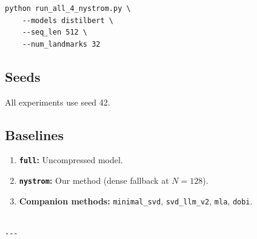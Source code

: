 \begin{lstlisting}
python run_all_4_nystrom.py \
    --models distilbert \
    --seq_len 512 \
    --num_landmarks 32
\end{lstlisting}

\subsection{Seeds}

All experiments use seed 42.

\subsection{Baselines}

\begin{enumerate}
\item \textbf{\texttt{full}:} Uncompressed model.
\item \textbf{\texttt{nystrom}:} Our method (dense fallback at $N=128$).
\item \textbf{Companion methods:} \texttt{minimal\_svd}, \texttt{svd\_llm\_v2}, \texttt{mla}, \texttt{dobi}.
\end{enumerate}
\begin{lstlisting}

---
\end{lstlisting}